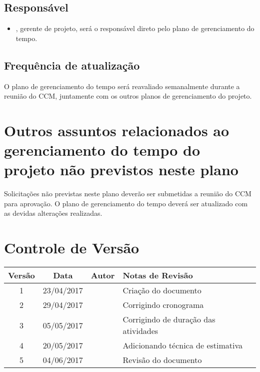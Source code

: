 \subsection{Responsável}

\begin{itemize}
	\item \projectManagerName{}, gerente de projeto, será o responsável direto pelo plano de gerenciamento do tempo.
\end{itemize}

\subsection{Frequência de atualização}

O plano de gerenciamento do tempo será reavaliado semanalmente durante a reunião do CCM, juntamente com os outros planos de gerenciamento do projeto.

\section{Outros assuntos relacionados ao gerenciamento do tempo do projeto não previstos neste plano}

Solicitações não previstas neste plano deverão ser submetidas a reunião do CCM para aprovação. O plano de gerenciamento do tempo deverá ser atualizado com as devidas alterações realizadas.

\section{Controle de Versão}

\begin{table}[H]
	\begin{tabularx}{\textwidth}{| c | c | X | X |}
		\hline
		\textbf{Versão} & \textbf{Data} & \textbf{Autor}        & \textbf{Notas de Revisão}             \\
		\hline
		1                & 23/04/2017    & \projectManagerName{} & Criação do documento                 \\
		\hline
		2                & 29/04/2017    & \projectManagerName{} & Corrigindo cronograma                  \\
		\hline
		3                & 05/05/2017    & \projectManagerName{} & Corrigindo de duração das atividades \\
		\hline
		4                & 20/05/2017    & \projectManagerName{} & Adicionando técnica de estimativa     \\
		\hline
		5                & 04/06/2017    & \projectManagerName{} & Revisão do documento                  \\
		\hline
	\end{tabularx}
	\centering
\end{table}

